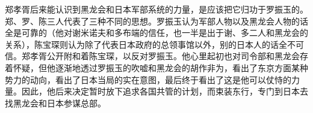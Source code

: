 郑孝胥后来能认识到黑龙会和日本军部系统的力量，是应该把它归功于罗振玉的。郑、罗、陈三人代表了三种不同的思想。罗振玉认为军部人物以及黑龙会人物的话全是可靠的（他对谢米诺夫和多布端的信任，也一半是出于谢、多二人和黑龙会的关系），陈宝琛则认为除了代表日本政府的总领事馆以外，别的日本人的话全不可信。郑孝胥公开附和着陈宝琛，以反对罗振玉。他心里起初也对司令部和黑龙会存着怀疑，但他逐渐地透过罗振玉的吹嘘和黑龙会的胡作非为，看出了东京方面某种势力的动向，看出了日本当局的实在意图，最后终于看出了这是他可以仗恃的力量。因此，他后来决定暂时放下追求各国共管的计划，而束装东行，专门到日本去找黑龙会和日本参谋总部。\\
